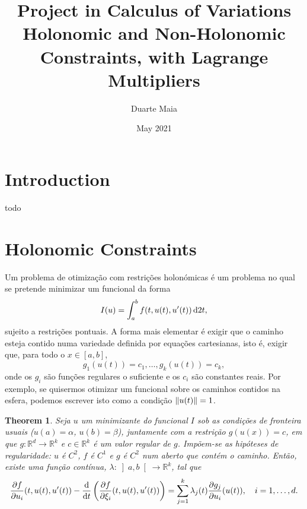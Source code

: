 \documentclass{article}
\title{Project in Calculus of Variations\\
\large Holonomic and Non-Holonomic Constraints, with Lagrange Multipliers}
\author{Duarte Maia}
\date{May 2021}
\newtheorem{theorem}{Theorem}
\theoremstyle{nonumberplain}
\theoremstyle{nonumberplain}
\newcommand{\R}{\mathbb{R}}
\DeclarePairedDelimiter\norm{\lVert}{\rVert}
\begin{document}
\maketitle

\section{Introduction}

todo

\section{Holonomic Constraints}

Um problema de otimização com restrições holonómicas é um problema no qual se pretende minimizar um funcional da forma
\[I(u) = \int_a^b f(t,u(t),u'(t)) \dl2 t,\]
sujeito a restrições pontuais. A forma mais elementar é exigir que o caminho esteja contido numa variedade definida por equações cartesianas, isto é, exigir que, para todo o $x \in [a,b]$,
\[g_1(u(t)) = c_1, \dots, g_k(u(t)) = c_k,\]
onde os $g_i$ são funções regulares o suficiente e os $c_i$ são constantes reais. Por exemplo, se quisermos otimizar um funcional sobre os caminhos contidos na esfera, podemos escrever isto como a condição $\norm{u(t)} = 1$.

\begin{theorem}
Seja $u$ um minimizante do funcional $I$ sob as condições de fronteira usuais ($u(a) = \alpha$, $u(b) = \beta$), juntamente com a restrição $g(u(x)) = c$, em que $g \colon \R^d \to \R^k$ e $c \in \R^k$ é um valor regular de $g$. Impõem-se as hipóteses de regularidade: $u$ é $C^2$, $f$ é $C^1$ e $g$ é $C^2$ num aberto que contém o caminho. Então, existe uma função contínua, $\lambda \colon \left]a,b\right[ \to \R^k$, tal que
\[\diffp f {u_i}(t,u(t),u'(t)) - \diff*{\left(\diffp f {\xi_i}(t,u(t),u'(t))\right)}t = \sum_{j=1}^k \lambda_j(t) \diffp {g_j} {u_i} (u(t)), \quad i = 1, \dots, d.\]
\end{theorem}
\end{document}
